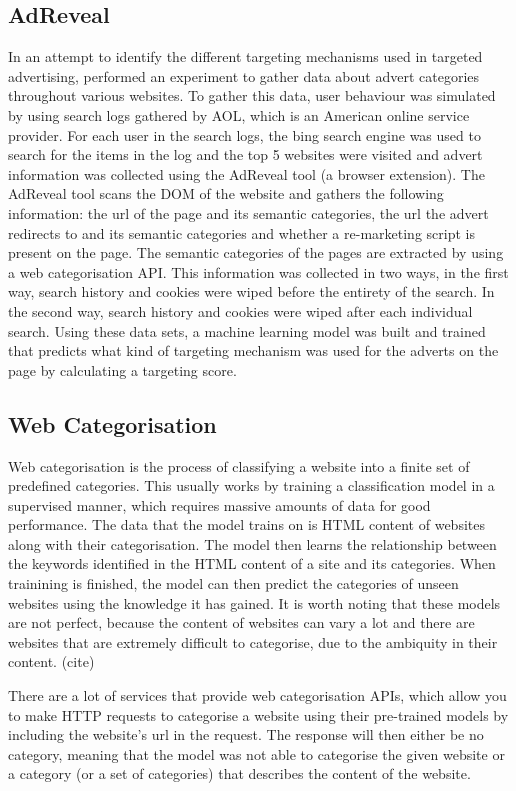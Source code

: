 \documentclass{l4proj}
\begin{document}
\subsection{AdReveal}
In an attempt to identify the different targeting mechanisms used in targeted advertising, \cite{Liu2013} performed an experiment to gather data about advert categories throughout various websites. To gather this data, user behaviour was simulated by using search logs gathered by AOL, which is an American online service provider. 
For each user in the search logs, the bing search engine was used to search for the items in the log and the top 5 websites were visited and advert information was collected using the AdReveal tool (a browser extension). The AdReveal tool scans the DOM of the website and gathers the following information: the url of the page and its semantic categories, the url the advert redirects to and its semantic categories and whether a re-marketing script is present on the page. The semantic categories of the pages are extracted by using a web categorisation API. 
This information was collected in two ways, in the first way, search history and cookies were wiped before the entirety of the search. In the second way, search history and cookies were wiped after each individual search. Using these data sets, a machine learning model was built and trained that predicts what kind of targeting mechanism was used for the adverts on the page by calculating a targeting score.

\subsection{Web Categorisation}
Web categorisation is the process of classifying a website into a finite set of predefined categories. This usually works by training a classification model in a supervised manner, which requires massive amounts of data for good performance. The data that the model trains on is HTML content of websites along with their categorisation. The model then learns the relationship between the keywords identified in the HTML content of a site and its categories. When trainining is finished, the model can then predict the categories of unseen websites using the knowledge it has gained. It is worth noting that these models are not perfect, because the content of websites can vary a lot and there are websites that are extremely difficult to categorise, due to the ambiquity in their content. (cite)

There are a lot of services that provide web categorisation APIs, which allow you to make HTTP requests to categorise a website using their pre-trained models by including the website's url in the request. The response will then either be no category, meaning that the model was not able to categorise the given website or a category (or a set of categories) that describes the content of the website.
\end{document}
